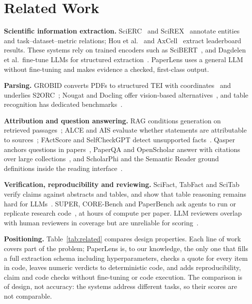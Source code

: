 \documentclass[conference]{IEEEtran}
\begin{document}
\section{Related Work}

\textbf{Scientific information extraction.} SciERC~\cite{luan2018sciierc} and
SciREX~\cite{jain2020scirex} annotate entities and task--dataset--metric relations; Hou et
al.~\cite{hou2019tdms} and AxCell~\cite{kardas2020axcell} extract leaderboard results. These
systems rely on trained encoders such as SciBERT~\cite{beltagy2019scibert}, and Dagdelen et
al.\ fine-tune LLMs for structured extraction~\cite{dagdelen2024structured}. PaperLens uses
a general LLM without fine-tuning and makes evidence a checked, first-class output.

\textbf{Parsing.} GROBID converts PDFs to structured TEI with
coordinates~\cite{lopez2009grobid} and underlies S2ORC~\cite{lo2020s2orc}; Nougat and
Docling offer vision-based alternatives~\cite{blecher2024nougat,auer2024docling}, and table
recognition has dedicated benchmarks~\cite{zhong2020pubtabnet,smock2022pubtables}.

\textbf{Attribution and question answering.} RAG conditions generation on retrieved
passages~\cite{lewis2020rag}; ALCE and AIS evaluate whether statements are attributable to
sources~\cite{gao2023alce,rashkin2023ais}; FActScore and SelfCheckGPT detect unsupported
facts~\cite{min2023factscore,manakul2023selfcheckgpt}. Qasper anchors questions in
papers~\cite{dasigi2021qasper}, PaperQA and OpenScholar answer with citations over large
collections~\cite{lala2023paperqa,asai2026openscholar}, and ScholarPhi and the Semantic
Reader ground definitions inside the reading
interface~\cite{head2021scholarphi,lo2024semanticreader}.

\textbf{Verification, reproducibility and reviewing.} SciFact, TabFact and SciTab verify
claims against abstracts and tables, and show that table reasoning remains hard for
LLMs~\cite{wadden2020scifact,chen2020tabfact,lu2023scitab}. SUPER, CORE-Bench and PaperBench
ask agents to run or replicate research
code~\cite{bogin2024super,siegel2024corebench,starace2025paperbench}, at hours of compute per
paper. LLM reviewers overlap with human reviewers in coverage but are unreliable for
scoring~\cite{liang2024feedback,zhou2024reliable}.

\textbf{Positioning.} Table~\ref{tab:related} compares design properties. Each line of work
covers part of the problem; PaperLens is, to our knowledge, the only one that fills a full
extraction schema including hyperparameters, checks a quote for every item in code, leaves
numeric verdicts to deterministic code, and adds reproducibility, claim and code checks
without fine-tuning or code execution. The comparison is of design, not accuracy: the
systems address different tasks, so their scores are not comparable.
\end{document}

